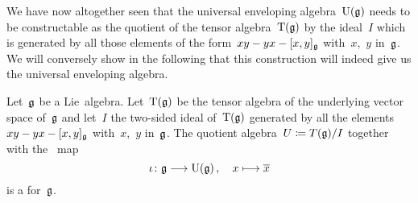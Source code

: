 \begin{fluff}
  We have now altogether seen that the universal enveloping algebra~$\operatorname{U}(\mathfrak{g})$ needs to be constructable as the quotient of the tensor algebra~$\operatorname{T}(\mathfrak{g})$ by the ideal~$I$ which is generated by all those elements of the form~$x y - y x - [x,y]_{\mathfrak{g}}$ with~$x$,~$y$ in~$\mathfrak{g}$.
  We will conversely show in the following  that this construction will indeed give us the universal enveloping algebra.
\end{fluff}


\begin{proposition}
  \label{existence of uea}
  Let~$\mathfrak{g}$ be a Lie~algebra.
  Let~$\operatorname{T}(\mathfrak{g})$ be the tensor algebra of the underlying vector space of~$\mathfrak{g}$ and let~$I$ the two-sided ideal of~$\operatorname{T}(\mathfrak{g})$ generated by all the elements $x y - y x - [x,y]_{\mathfrak{g}}$ with~$x$,~$y$ in~$\mathfrak{g}$.
  The quotient algebra~$U \coloneqq T(\mathfrak{g})/I$ together with the~{\linear{$\kf$}} map
  \[
    \iota
    \colon
    \glie
    \to
    \Univ(\glie) \,,
    \quad
    x
    \mapsto
    \class{x}
  \]
  is a {\ua} for~$\mathfrak{g}$.
\end{proposition}


